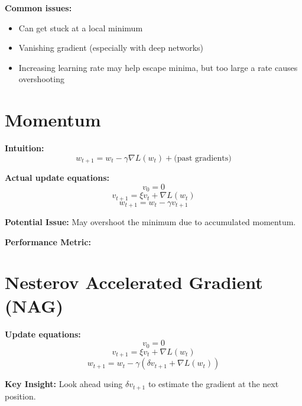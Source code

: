 \vspace{1em}
\textbf{Common issues:}
\begin{itemize}
    \item Can get stuck at a local minimum
    \item Vanishing gradient (especially with deep networks)
    \item Increasing learning rate may help escape minima, but too large a rate causes overshooting
\end{itemize}

\section{Momentum}

\textbf{Intuition:}
\[
    w_{t+1} = w_t - \gamma \nabla L(w_t) + \text{(past gradients)}
\]

\textbf{Actual update equations:}
\[
    v_0 = 0
\]
\[
    v_{t+1} = \xi v_t + \nabla L(w_t)
\]
\[
    w_{t+1} = w_t - \gamma v_{t+1}
\]

\textbf{Potential Issue:} May overshoot the minimum due to accumulated momentum.

\textbf{Performance Metric:} 

\section{Nesterov Accelerated Gradient (NAG)}

\textbf{Update equations:}
\[
    v_0 = 0
\]
\[
    v_{t+1} = \xi v_t + \nabla L(w_t)
\]
\[
    w_{t+1} = w_t - \gamma (\delta v_{t+1} + \nabla L(w_t))
\]

\textbf{Key Insight:} Look ahead using $\delta v_{t+1}$ to estimate the gradient at the next position.

